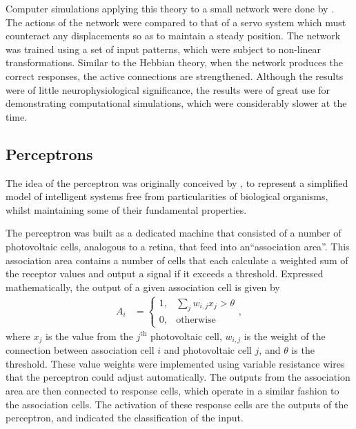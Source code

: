 Computer simulations applying this theory to a small network were done by
\cite{Farley:1954:Simulation}.
The actions of the network were compared to that of a servo system which must
counteract any displacements so as to maintain a steady position.
The network was trained using a set of input patterns, which were subject to
non-linear transformations.
Similar to the Hebbian theory, when the network produces the correct responses,
the active connections are strengthened.
Although the results were of little neurophysiological significance, the results
were of great use for demonstrating computational simulations, which were
considerably slower at the time.




\subsection{Perceptrons}

The idea of the perceptron was originally conceived by
\cite{Rosenblatt:1958:Perceptron}, to represent a simplified model of
intelligent systems free from particularities of biological organisms, whilst
maintaining some of their fundamental properties.

The perceptron was built as a dedicated machine that consisted of a number of
photovoltaic cells, analogous to a retina, that feed into an``association
area''.
This association area contains a number of cells that each calculate a weighted
sum of the receptor values and output a signal if it exceeds a threshold.
Expressed mathematically, the output of a given association cell is given by
\begin{align*}
    A_i &= \begin{cases}
        1, & \sum_j w_{i,j}x_j > \theta\\
        0, & \text{otherwise}
    \end{cases},
\end{align*}
where $x_j$ is the value from the $j^\text{th}$ photovoltaic cell, $w_{i,j}$
is the weight of the connection between association cell $i$ and photovoltaic
cell $j$, and $\theta$ is the threshold.
These value weights were implemented using variable resistance wires that the
perceptron could adjust automatically.
The outputs from the association area are then connected to response cells,
which operate in a similar fashion to the association cells.
The activation of these response cells are the outputs of the perceptron, and
indicated the classification of the input.

